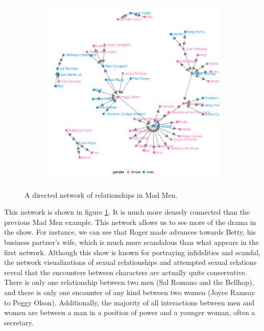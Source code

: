 \begin{figure}[hbtp]
\begin{subfigure}[t]{\textwidth}
\begin{adjustbox}{valign=t}
\begin{minipage}{.49\textwidth}
                   \end{minipage}

                  \begin{minipage}{.49\textwidth}

\includegraphics[width=\textwidth]{figure/madmen2_ggnetwork-1.pdf}

                          \end{minipage}

                          \end{adjustbox}
\end{subfigure}
\caption{\label{fig.cap:madmen2} A directed network of relationships in Mad Men.}
\end{figure}
\afterpage{\clearpage}

This network is shown in figure \ref{fig.cap:madmen2}.  It is much more densely connected than the previous Mad Men example.  This network allows us to see more of the drama in the show. For instance, we can see that Roger made advances towards Betty, his business partner's wife, which is much more scandalous than what appears in the first network. Although this show is known for portraying infidelities and scandal, the network visualizations of sexual relationships and attempted sexual relations reveal that the encounters between characters are actually quite conservative. There is only one relationship between two men (Sal Romano and the Bellhop), and there is only one encounter of any kind between two women (Joyce Ramsay to Peggy Olson). Additionally, the majority of all interactions between men and women are between a man in a position of power and a younger woman, often a secretary.

